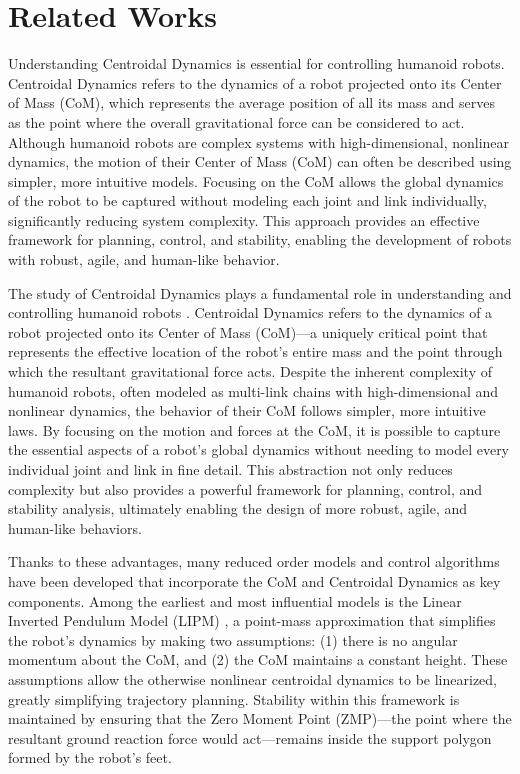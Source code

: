 \documentclass[main.tex]{subfiles}
\begin{document}
\section{Related Works}\label{sec:relatedworks}
Understanding Centroidal Dynamics \cite{orin2013centroidal} is essential for controlling humanoid robots. Centroidal Dynamics \cite{orin2013centroidal} refers to the dynamics of a robot projected onto its Center of Mass (CoM),  which represents the average position of all its mass and serves as the point where the overall gravitational force can be considered to act. Although humanoid robots are complex systems with high-dimensional, nonlinear dynamics, the motion of their Center of Mass (CoM) can often be described using simpler, more intuitive models. Focusing on the CoM allows the global dynamics of the robot to be captured without modeling each joint and link individually, significantly reducing system complexity. This approach provides an effective framework for planning, control, and stability, enabling the development of robots with robust, agile, and human-like behavior.

The study of Centroidal Dynamics plays a fundamental role in understanding and controlling humanoid robots \cite{CD}. Centroidal Dynamics refers to the dynamics of a robot projected onto its Center of Mass (CoM)—a uniquely critical point that represents the effective location of the robot’s entire mass and the point through which the resultant gravitational force acts. Despite the inherent complexity of humanoid robots, often modeled as multi-link chains with high-dimensional and nonlinear dynamics, the behavior of their CoM follows simpler, more intuitive laws. By focusing on the motion and forces at the CoM, it is possible to capture the essential aspects of a robot's global dynamics without needing to model every individual joint and link in fine detail. This abstraction not only reduces complexity but also provides a powerful framework for planning, control, and stability analysis, ultimately enabling the design of more robust, agile, and human-like behaviors.

Thanks to these advantages, many reduced order models and control algorithms have been developed that incorporate the CoM and Centroidal Dynamics as key components. Among the earliest and most influential models is the Linear Inverted Pendulum Model (LIPM) \cite{LIPM}, a point-mass approximation that simplifies the robot’s dynamics by making two assumptions: (1) there is no angular momentum about the CoM, and (2) the CoM maintains a constant height. These assumptions allow the otherwise nonlinear centroidal dynamics to be linearized, greatly simplifying trajectory planning. Stability within this framework is maintained by ensuring that the Zero Moment Point (ZMP)—the point where the resultant ground reaction force would act—remains inside the support polygon formed by the robot’s feet.
\end{document}

